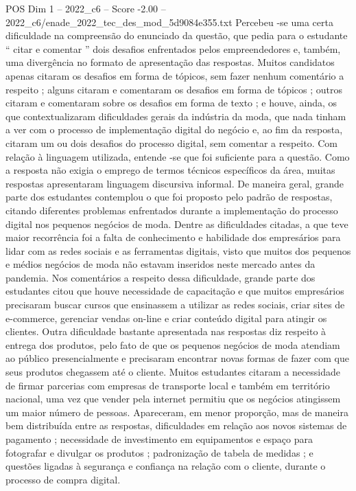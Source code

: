 \begin{textsample}{POS Dim 1 – 2022\_c6 – Score -2.00 – 2022\_c6/enade\_2022\_tec\_des\_mod\_5d9084e355.txt}
Percebeu -se uma certa dificuldade na compreensão do enunciado da questão, que pedia para o estudante “ citar e comentar ” dois desafios enfrentados pelos empreendedores e, também, uma divergência no formato de apresentação das respostas.
Muitos candidatos apenas citaram os desafios em forma de tópicos, sem fazer nenhum comentário a respeito ; alguns citaram e comentaram os desafios em forma de tópicos ; outros citaram e comentaram sobre os desafios em forma de texto ; e houve, ainda, os que contextualizaram dificuldades gerais da indústria da moda, que nada tinham a ver com o processo de implementação digital do negócio e, ao fim da resposta, citaram um ou dois desafios do processo digital, sem comentar a respeito.
Com relação à linguagem utilizada, entende -se que foi suficiente para a questão.
Como a resposta não exigia o emprego de termos técnicos específicos da área, muitas respostas apresentaram linguagem discursiva informal.
De maneira geral, grande parte dos estudantes contemplou o que foi proposto pelo padrão de respostas, citando diferentes problemas enfrentados durante a implementação do processo digital nos pequenos negócios de moda.
Dentre as dificuldades citadas, a que teve maior recorrência foi a falta de conhecimento e habilidade dos empresários para lidar com as redes sociais e as ferramentas digitais, visto que muitos dos pequenos e médios negócios de moda não estavam inseridos neste mercado antes da pandemia.
Nos comentários a respeito dessa dificuldade, grande parte dos estudantes citou que houve necessidade de capacitação e que muitos empresários precisaram buscar cursos que ensinassem a utilizar as redes sociais, criar sites de e-commerce, gerenciar vendas on-line e criar conteúdo digital para atingir os clientes.
Outra dificuldade bastante apresentada nas respostas diz respeito à entrega dos produtos, pelo fato de que os pequenos negócios de moda atendiam ao público presencialmente e precisaram encontrar novas formas de fazer com que seus produtos chegassem até o cliente.
Muitos estudantes citaram a necessidade de firmar parcerias com empresas de transporte local e também em território nacional, uma vez que vender pela internet permitiu que os negócios atingissem um maior número de pessoas.
Apareceram, em menor proporção, mas de maneira bem distribuída entre as respostas, dificuldades em relação aos novos sistemas de pagamento ; necessidade de investimento em equipamentos e espaço para fotografar e divulgar os produtos ; padronização de tabela de medidas ; e questões ligadas à segurança e confiança na relação com o cliente, durante o processo de compra digital.

\end{textsample}
